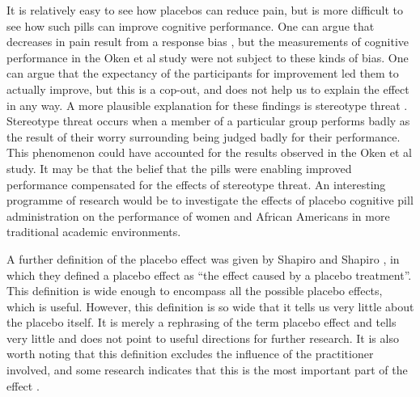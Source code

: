It is relatively easy to see how placebos can reduce pain, but is more difficult to see how such pills can improve cognitive performance. One can argue that decreases in pain result from a response bias \cite{Allan2002}, but the measurements of cognitive performance in the Oken et al study were not subject to these kinds of bias.   One can argue that the expectancy of the participants for improvement led them to actually improve, but this is a cop-out, and does not help us to explain the effect in any way. A more plausible explanation for these findings is stereotype threat \cite{schmader2003converging,spencerclaude1999stereotype}. Stereotype threat occurs when a member of a particular group performs badly as the result of their worry surrounding being judged badly for their performance. This phenomenon could have accounted for the results observed in the Oken et al study. It may be that the belief that the pills were enabling improved performance compensated for the effects of stereotype threat. An interesting programme of research would be to investigate the effects of placebo cognitive pill administration on the performance of women and African Americans in more traditional academic environments.  


A further definition of the placebo effect was given by Shapiro and Shapiro \cite{Shapiro1997}, in which they defined a placebo effect as ``the effect caused by a placebo treatment''. This definition is wide enough to encompass all the possible placebo effects, which is useful. However, this definition is so wide that it tells us very little about the placebo itself. It is merely a rephrasing of the term placebo effect and tells very little and does not point to useful directions for further research. It is also worth noting that this definition excludes the influence of the practitioner involved, and some research indicates that this is the most important part of the effect \cite{Blasi2001,Kaptchuk2008}.


